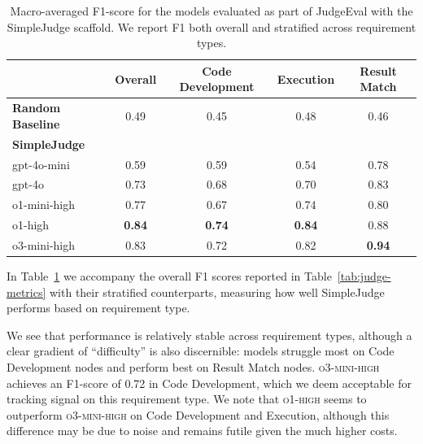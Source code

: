 \documentclass{article}
\theoremstyle{plain}
\theoremstyle{definition}
\theoremstyle{remark}
\begin{document}
\begin{table}[htb]
\centering
\caption{Macro-averaged F1-score for the models evaluated as part of JudgeEval with the SimpleJudge scaffold. We report F1 both overall and stratified across requirement types.}
\label{tab:judge-eval-stratified-f1}
\begin{small}
\begin{sc}
\begin{tabular}{@{}lcccc@{}}
\toprule
           & Overall & Code Development & Execution & Result Match \\ \midrule
\textbf{Random Baseline} & 0.49    & 0.45             & 0.48           & 0.46            \\
\midrule
\textbf{SimpleJudge}\\
\quad gpt-4o-mini     & 0.59    & 0.59              & 0.54           & 0.78            \\
\quad gpt-4o          & 0.73    & 0.68             & 0.70           & 0.83            \\
\quad o1-mini-high    & 0.77    & 0.67             & 0.74            & 0.80            \\
\quad o1-high         & \textbf{0.84}    & \textbf{0.74}             & \textbf{0.84}           & 0.88             \\
\quad o3-mini-high    & 0.83    & 0.72             & 0.82           & \textbf{0.94}            \\
 \bottomrule
\end{tabular}
\end{sc}
\end{small}
\end{table}

In Table~\ref{tab:judge-eval-stratified-f1} we accompany the overall F1 scores reported in Table~\ref{tab:judge-metrics} with their stratified counterparts, measuring how well SimpleJudge performs based on requirement type.

We see that performance is relatively stable across requirement types, although a clear gradient of ``difficulty'' is also discernible: models struggle most on Code Development nodes and perform best on Result Match nodes. \textsc{o3-mini-high} achieves an F1-score of 0.72 in Code Development, which we deem acceptable for tracking signal on this requirement type. We note that \textsc{o1-high} seems to outperform \textsc{o3-mini-high} on Code Development and Execution, although this difference may be due to noise and remains futile given the much higher costs.
\end{document}
